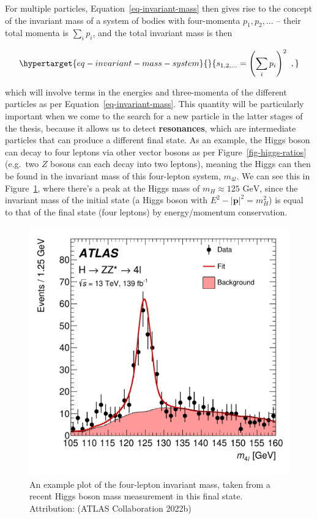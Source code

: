 \documentclass[
  11pt,
  numbers=noendperiod]{book}
\begin{document}
For multiple particles, Equation~\ref{eq-invariant-mass} then gives rise
to the concept of the invariant mass of a system of bodies with
four-momenta \(p_1, p_2, ...\) -- their total momenta is \(\sum_i p_i\),
and the total invariant mass is then

\begin{equation}\protect\hypertarget{eq-invariant-mass-system}{}{
s_{1,2,...} = \left(\sum_i p_i\right)^2 ~,
}\label{eq-invariant-mass-system}\end{equation}

which will involve terms in the energies and three-momenta of the
different particles as per Equation~\ref{eq-invariant-mass}. This
quantity will be particularly important when we come to the search for a
new particle in the latter stages of the thesis, because it allows us to
detect \textbf{resonances}, which are intermediate particles that can
produce a different final state. As an example, the Higgs boson can
decay to four leptons via other vector bosons as per
Figure~\ref{fig-higgs-ratios} (e.g.~two \(Z\) bosons can each decay into
two leptons), meaning the Higgs can then be found in the invariant mass
of this four-lepton system, \(m_{4l}\). We can see this in
Figure~\ref{fig-higgs-m4l}, where there's a peak at the Higgs mass of
\(m_H \approx 125\) \(\text{GeV}\), since the invariant mass of the
initial state (a Higgs boson with \(E^2 - |\mathbf{p}|^2 = m_H^2\)) is
equal to that of the final state (four leptons) by energy/momentum
conservation.

\begin{figure}

{\centering \includegraphics{./images/higgsm4l.pdf}

}

\caption{\label{fig-higgs-m4l}An example plot of the four-lepton
invariant mass, taken from a recent Higgs boson mass measurement in this
final state. Attribution: (ATLAS Collaboration 2022b)}

\end{figure}
\end{document}
